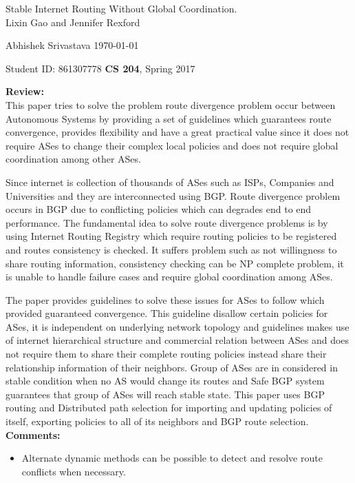 \documentclass[a4paper,12pt, twoside]{article}
\renewcommand{\maketitle}{%
 	\Large
 	\begin{center}
 	Stable Internet Routing Without Global Coordination.\\	
 	\normalsize Lixin Gao and Jennifer Rexford
 	\end{center}
 
 	\Large
	Abhishek Srivastava
	\hfill
	\normalsize
	\today
 	\par
 	Student ID: 861307778
 	\hfill
 	\textbf{CS 204}, Spring 2017
 	\par 	
 	\hrulefill
 	\par
 	}
\begin{document}
\thispagestyle{empty}
	
\maketitle

\textbf{Review:}\\
This paper tries to solve the problem route divergence problem occur between Autonomous Systems by providing a set of guidelines which guarantees route convergence, provides flexibility and have a great practical value since it does not require ASes to change their complex local policies and does not require global coordination among other ASes.


Since internet is collection of thousands of ASes such as ISPs, Companies and Universities and they are interconnected using BGP. Route divergence problem occurs in BGP due to conflicting policies which can degrades end to end performance. The fundamental idea to solve route divergence problems is by using Internet Routing Registry which require routing policies to be registered and routes consistency is checked. It suffers problem such as not willingness to share routing information, consistency checking can be NP complete problem, it is unable to handle failure cases and require global coordination among ASes. 

The paper provides guidelines to solve these issues for ASes to follow which provided guaranteed convergence. This guideline disallow certain policies for ASes, it is independent on underlying network topology and guidelines makes use of internet hierarchical structure and commercial relation between ASes and does not require them to share their complete routing policies instead share their relationship information of their neighbors. Group of ASes are in considered in stable condition when no AS would change its routes and Safe BGP system guarantees that group of ASes will reach stable state. This paper uses BGP routing and Distributed path selection for importing and updating policies of itself, exporting policies to all of its neighbors and BGP route selection.   \\ 


\textbf{Comments:}
\begin{itemize}
	\item Alternate dynamic methods can be possible to detect and resolve route conflicts when necessary.
\end{itemize}
\end{document}
